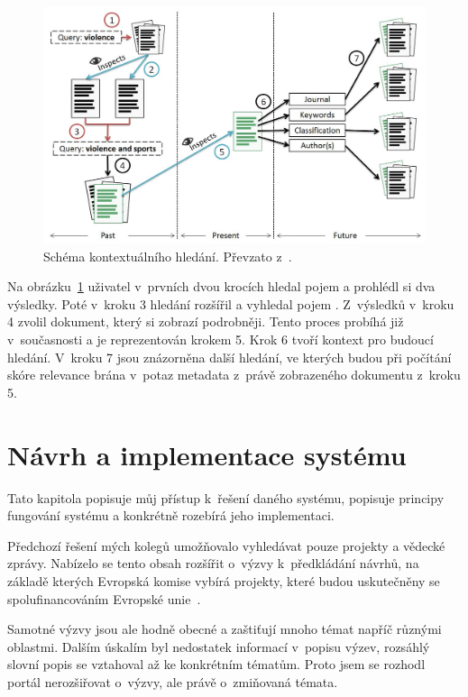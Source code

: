\begin{figure}[H]
	\centering
	\includegraphics[width=\textwidth]{obrazky-figures/contextual.png}
	\caption{Schéma kontextuálního hledání. Převzato z~\cite{bib:similarity-context}.}
	\label{img:contextual}
\end{figure}

Na obrázku~\ref{img:contextual} uživatel v~prvních dvou krocích hledal pojem  a prohlédl si dva výsledky. Poté v~kroku 3 hledání rozšířil a vyhledal pojem . Z~výsledků v~kroku 4 zvolil dokument, který si zobrazí podrobněji. Tento proces probíhá již v~současnosti a je reprezentován krokem 5. Krok 6 tvoří kontext pro budoucí hledání. V~kroku 7 jsou znázorněna další hledání, ve kterých budou při počítání skóre relevance brána v~potaz metadata z~právě zobrazeného dokumentu z~kroku 5.





\chapter{Návrh a implementace systému}
Tato kapitola popisuje můj přístup k~řešení daného systému, popisuje principy fungování systému a konkrétně rozebírá jeho implementaci.

Předchozí řešení mých kolegů umožňovalo vyhledávat pouze projekty a vědecké zprávy. Nabízelo se tento obsah rozšířit o~výzvy k~předkládání návrhů, na základě kterých Evropská komise vybírá projekty, které budou uskutečněny se spolufinancováním Evropské unie~\cite{bib:funding-about}.

Samotné výzvy jsou ale hodně obecné a zaštiťují mnoho témat napříč různými oblastmi. Dalším úskalím byl nedostatek informací v~popisu výzev, rozsáhlý slovní popis se vztahoval až ke konkrétním tématům. Proto jsem se rozhodl portál nerozšiřovat o~výzvy, ale právě o~zmiňovaná témata.

